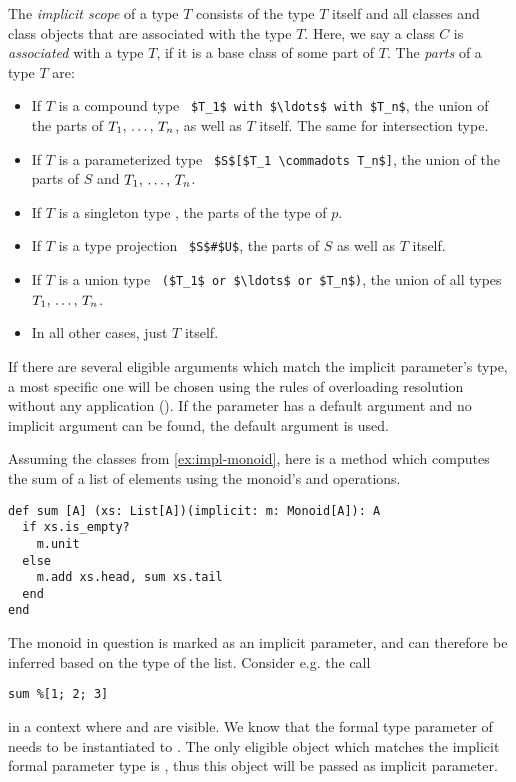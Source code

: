 The {\em implicit scope} of a type $T$ consists of the type $T$ itself and all classes and class objects that are associated with the type $T$. Here, we say a class $C$ is {\em associated} with a type $T$, if it is a base class of some part of $T$. The {\em parts} of a type $T$ are:
\begin{itemize}
  \item If $T$ is a compound type ~\lstinline!$T_1$ with $\ldots$ with $T_n$!, the union of the parts of $T_1 ,\, \ldots ,\, T_n$, as well as $T$ itself. The same for intersection type. 
  \item If $T$ is a parameterized type ~\lstinline!$S$[$T_1 \commadots T_n$]!, the union of the parts of $S$ and $T_1 ,\, \ldots ,\, T_n$. 
  \item If $T$ is a singleton type , the parts of the type of $p$. 
  \item If $T$ is a type projection ~\lstinline!$S$#$U$!, the parts of $S$ as well as $T$ itself.
  \item If $T$ is a union type ~\lstinline!($T_1$ or $\ldots$ or $T_n$)!, the union of all types $T_1 ,\, \ldots ,\, T_n$. 
  \item In all other cases, just $T$ itself. 
\end{itemize}

If there are several eligible arguments which match the implicit parameter's type, a most specific one will be chosen using the rules of overloading resolution without any application (). If the parameter has a default argument and no implicit argument can be found, the default argument is used. 

\example Assuming the classes from \ref{ex:impl-monoid}, here is a method which computes the sum of a list of elements using the monoid's  and  operations.
\begin{lstlisting}
def sum [A] (xs: List[A])(implicit: m: Monoid[A]): A 
  if xs.is_empty?
    m.unit
  else
    m.add xs.head, sum xs.tail
  end
end
\end{lstlisting}

The monoid in question is marked as an implicit parameter, and can therefore be inferred based on the type of the list. Consider e.g. the call
\begin{lstlisting}
sum %[1; 2; 3]
\end{lstlisting}
in a context where  and  are visible. We know that the formal type parameter  of  needs to be instantiated to . The only eligible object which matches the implicit formal parameter type  is , thus this object will be passed as implicit parameter. 






